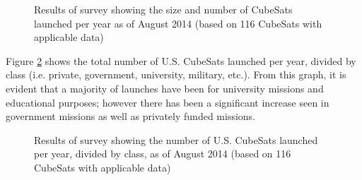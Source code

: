 \documentclass[11pt]{article}
\begin{document}
\begin{figure}[h]
\centering
{}
\caption{Results of survey showing the size and number of CubeSats launched per year as of August 2014 (based on 116 CubeSats with applicable data)}
\label{peryear}
\end{figure}

Figure \ref{classperyear} shows the total number of U.S. CubeSats launched per year, divided by class (i.e. private, government, university, military, etc.).  From this graph, it is evident that a majority of launches have been for university missions and educational purposes;  however there has been a significant increase seen in government missions as well as privately funded missions.  

\begin{figure}[ht!]
\centering
{}
\caption{Results of survey showing the number of U.S. CubeSats launched per year, divided by class, as of August 2014 (based on 116 CubeSats with applicable data)}
\label{classperyear}
\end{figure}
\end{document}
